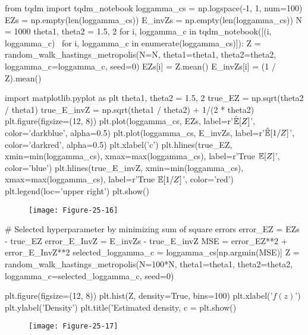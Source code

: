 \begin{python}
from tqdm import tqdm_notebook
loggamma_cs = np.logspace(-1, 1, num=100)
EZs = np.empty(len(loggamma_cs))
E_invZs = np.empty(len(loggamma_cs))
N = 1000
theta1, theta2 = 1.5, 2
for i, loggamma_c in tqdm_notebook([(i, loggamma_c) \ 
        for i, loggamma_c in enumerate(loggamma_cs)]):
    Z = random_walk_hastings_metropolis(N=N, theta1=theta1, theta2=theta2, 
        loggamma_c=loggamma_c, seed=0)
    EZs[i] = Z.mean()
    E_invZs[i] = (1 / Z).mean()
\end{python}

\begin{python}
import matplotlib.pyplot as plt
theta1, theta2 = 1.5, 2
true_EZ = np.sqrt(theta2 / theta1)
true_E_invZ = np.sqrt(theta1 / theta2) + 1/(2 * theta2)
plt.figure(figsize=(12, 8))
plt.plot(loggamma_cs, EZs, label=r'$\hat{\operatorname{\mathbb{E}}}[Z]$', 
    color='darkblue', alpha=0.5)
plt.plot(loggamma_cs, E_invZs, label=r'$\hat{\operatorname{\mathbb{E}}}[1 / Z]$', 
    color='darkred', alpha=0.5)
plt.xlabel('c')
plt.hlines(true_EZ, xmin=min(loggamma_cs), xmax=max(loggamma_cs), 
    label=r'True $\operatorname{\mathbb{E}}[Z]$', color='blue')
plt.hlines(true_E_invZ, xmin=min(loggamma_cs), xmax=max(loggamma_cs), 
    label=r'True $\operatorname{\mathbb{E}}[1 / Z]$', color='red')
plt.legend(loc='upper right')
plt.show()
\end{python}

\begin{figure}[H]
\centering
\texttt{[image: Figure-25-16]}
\end{figure}


\begin{python}
# Selected hyperparameter by minimizing sum of square errors
error_EZ = EZs - true_EZ
error_E_InvZ = E_invZs - true_E_invZ
MSE = error_EZ**2 + error_E_InvZ**2
selected_loggamma_c = loggamma_cs[np.argmin(MSE)]
Z = random_walk_hastings_metropolis(N=100*N, theta1=theta1, theta2=theta2, 
    loggamma_c=selected_loggamma_c, seed=0)
\end{python}

\begin{python}
plt.figure(figsize=(12, 8))
plt.hist(Z, density=True, bins=100)
plt.xlabel('$f(z)$')
plt.ylabel('Density')
plt.title('Estimated density, c = %
plt.show()
\end{python}

\begin{figure}[H]
\centering
\texttt{[image: Figure-25-17]}
\end{figure}


